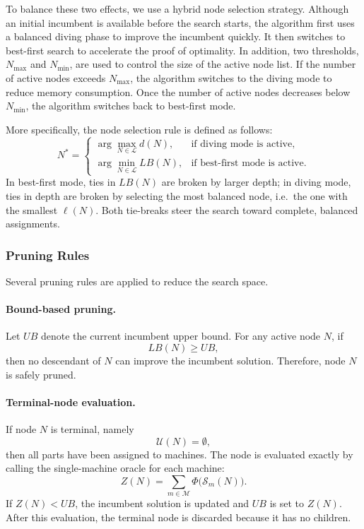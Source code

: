 \documentclass[letterpaper, 10 pt, conference]{ieeeconf}  %
\begin{document}
To balance these two effects, we use a hybrid node selection strategy. Although an initial incumbent is available before the search starts, the algorithm first uses a balanced diving phase to improve the incumbent quickly. It then switches to best-first search to accelerate the proof of optimality. In addition, two thresholds, $N_{\max}$ and $N_{\min}$, are used to control the size of the active node list. If the number of active nodes exceeds $N_{\max}$, the algorithm switches to the diving mode to reduce memory consumption. Once the number of active nodes decreases below $N_{\min}$, the algorithm switches back to best-first mode.

More specifically, the node selection rule is defined as follows:
\[
N^*=
\begin{cases}
	\arg\max_{N\in\mathcal{L}} d(N), & \text{if diving mode is active},\\[1mm]
	\arg\min_{N\in\mathcal{L}} LB(N), & \text{if best-first mode is active}.
\end{cases}
\]
In best-first mode, ties in $LB(N)$ are broken by larger depth; in diving mode, ties in depth are broken by selecting the most balanced node, i.e.\ the one with the smallest $\ell(N)$. Both tie-breaks steer the search toward complete, balanced assignments.

\subsubsection{Pruning Rules}

Several pruning rules are applied to reduce the search space.

\paragraph*{Bound-based pruning.}
Let $UB$ denote the current incumbent upper bound. For any active node $N$,
if
\[
LB(N)\ge UB,
\]
then no descendant of $N$ can improve the incumbent solution. Therefore,
node $N$ is safely pruned.

\paragraph*{Terminal-node evaluation.}
If node $N$ is terminal, namely
\[
\mathcal{U}(N)=\emptyset,
\]
then all parts have been assigned to machines. The node is evaluated exactly
by calling the single-machine oracle for each machine:
\[
Z(N)=
\sum_{m\in\mathcal{M}}
\Phi\bigl(\mathcal{S}_m(N)\bigr).
\]
If $Z(N)<UB$, the incumbent solution is updated and $UB$ is set to $Z(N)$.
After this evaluation, the terminal node is discarded because it has no
children.
\end{document}
